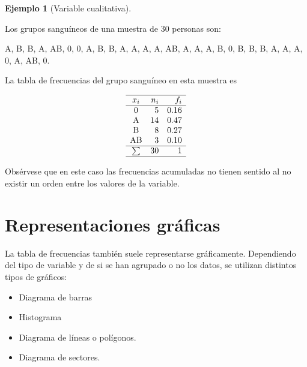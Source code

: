 \documentclass[
  a4paper,
]{scrreport}
\theoremstyle{plain}
\theoremstyle{definition}
\newtheorem{example}{Ejemplo}[chapter]
\theoremstyle{definition}
\theoremstyle{remark}
\begin{document}
\begin{example}[Variable
cualitativa]\protect\hypertarget{exm-tabla-frecuencias-cualitativa}{}\label{exm-tabla-frecuencias-cualitativa}

Los grupos sanguíneos de una muestra de 30 personas son:

A, B, B, A, AB, 0, 0, A, B, B, A, A, A, A, AB, A, A, A, B, 0, B, B, B,
A, A, A, 0, A, AB, 0.

La tabla de frecuencias del grupo sanguíneo en esta muestra es

\[
\begin{array}{crr}
\hline
x_i & n_i & f_i \\
\hline
\mbox{0} & 5 & 0.16 \\
\mbox{A} & 14 & 0.47 \\
\mbox{B} & 8 & 0.27 \\
\mbox{AB} & 3 & 0.10 \\
\hline
\sum & 30 & 1 \\
\hline
\end{array}
\]

\end{example}

\begin{tcolorbox}[enhanced jigsaw, arc=.35mm, leftrule=.75mm, bottomtitle=1mm, colbacktitle=quarto-callout-warning-color!10!white, title=\textcolor{quarto-callout-warning-color}{\faExclamationTriangle}\hspace{0.5em}{Advertencia}, opacitybacktitle=0.6, bottomrule=.15mm, opacityback=0, breakable, colframe=quarto-callout-warning-color-frame, coltitle=black, toprule=.15mm, toptitle=1mm, titlerule=0mm, rightrule=.15mm, left=2mm, colback=white]

Obsérvese que en este caso las frecuencias acumuladas no tienen sentido
al no existir un orden entre los valores de la variable.

\end{tcolorbox}

\hypertarget{representaciones-gruxe1ficas}{%
\section{Representaciones gráficas}\label{representaciones-gruxe1ficas}}

La tabla de frecuencias también suele representarse gráficamente.
Dependiendo del tipo de variable y de si se han agrupado o no los datos,
se utilizan distintos tipos de gráficos:

\begin{itemize}
\item
  Diagrama de barras
\item
  Histograma
\item
  Diagrama de líneas o polígonos.
\item
  Diagrama de sectores.
\end{itemize}
\end{document}
